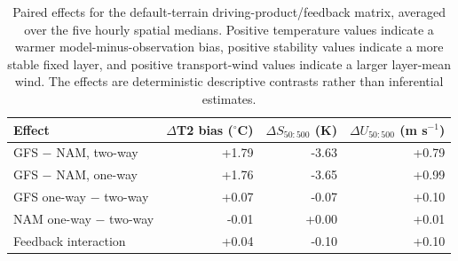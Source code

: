 \documentclass[air,article,submit,moreauthors]{Definitions/mdpi}
\begin{document}
\begin{table}[H]
\caption{Paired effects for the default-terrain driving-product/feedback matrix, averaged over the five hourly spatial medians.
Positive temperature values indicate a warmer model-minus-observation bias, positive stability values indicate a more stable fixed layer, and positive transport-wind values indicate a larger layer-mean wind.
The effects are deterministic descriptive contrasts rather than inferential estimates.}
\label{tab:v3-effects}
\centering
\begin{tabular}{lrrr}
\toprule
Effect & $\Delta$T2 bias ($^{\circ}$C) & $\Delta S_{50:500}$ (K) & $\Delta U_{50:500}$ (m s$^{-1}$) \\
\midrule
GFS $-$ NAM, two-way & +1.79 & -3.63 & +0.79 \\
GFS $-$ NAM, one-way & +1.76 & -3.65 & +0.99 \\
GFS one-way $-$ two-way & +0.07 & -0.07 & +0.10 \\
NAM one-way $-$ two-way & -0.01 & +0.00 & +0.01 \\
Feedback interaction & +0.04 & -0.10 & +0.10 \\
\bottomrule
\end{tabular}
\end{table}
\end{document}
